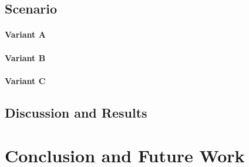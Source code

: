 \documentclass[conference]{IEEEtran}
\begin{document}
\subsection{Scenario}

\paragraph*{Variant A}
\paragraph*{Variant B}
\paragraph*{Variant C}

\subsection{Discussion and Results}
\section{Conclusion and Future Work}
\label{sec:conclusion}



\end{document}
